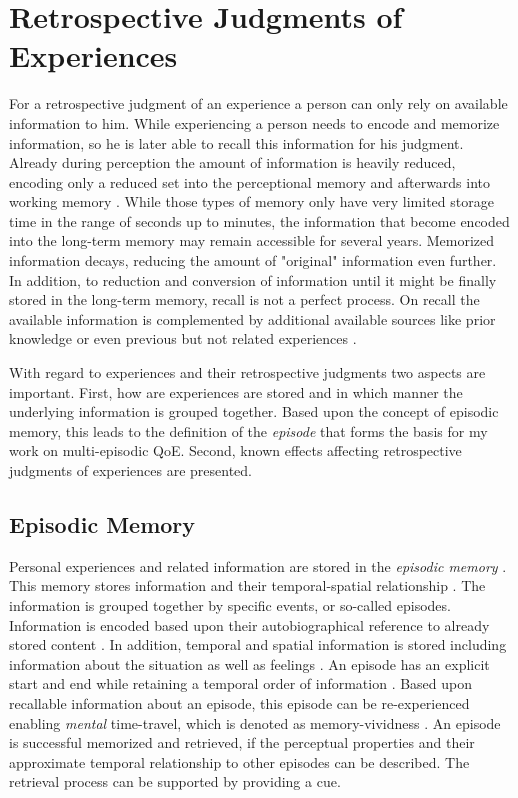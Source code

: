 \section{Retrospective Judgments of Experiences}\label{chap:03}
For a retrospective judgment of an experience a person can only rely on available information to him.
While experiencing a person needs to encode and memorize information, so he is later able to recall this information for his judgment.
Already during perception the amount of information is heavily reduced, encoding only a reduced set into the perceptional memory and afterwards into working memory \cite[\cf,][p.~8f.]{raake_speech_2006}.
While those types of memory only have very limited storage time in the range of seconds up to minutes, the information that become encoded into the long-term memory may remain accessible for several years.
Memorized information decays, reducing the amount of "original" information even further.
In addition, to reduction and conversion of information until it might be finally stored in the long-term memory, recall is not a perfect process.
On recall the available information is complemented by additional available sources like prior knowledge or even previous but not related experiences \citep[\cf,][]{schacter_seven_2003}.

With regard to experiences and their retrospective judgments two aspects are important.
First, how are experiences are stored and in which manner the underlying information is grouped together.
Based upon the concept of episodic memory, this leads to the definition of the \emph{episode} that forms the basis for my work on multi-episodic \ac{QoE}.
Second, known effects affecting retrospective judgments of experiences are presented.

\subsection{Episodic Memory}
Personal experiences and related information are stored in the \emph{episodic memory} \citep{tulving_episodic_1972}.
This memory stores information and their temporal-spatial relationship \citep[][p.~385]{tulving_episodic_1972}.
The information is grouped together by specific events, or so-called episodes.
Information is encoded based upon their autobiographical reference to already stored content \citep[][p.~385f.]{tulving_episodic_1972}.
In addition, temporal and spatial information is stored including information about the situation as well as feelings \citep[][p.~385f.]{tulving_episodic_1972}.
An episode has an explicit start and end while retaining a temporal order of information \citep[][p.~262]{conway_construction_2000}.
Based upon recallable information about an episode, this episode can be re-experienced enabling \emph{mental} time-travel, which is denoted as memory-vividness \citep{conway_construction_2000}.
An episode is successful memorized and retrieved, if the perceptual properties and their approximate temporal relationship to other episodes can be described.
The retrieval process can be supported by providing a cue.

